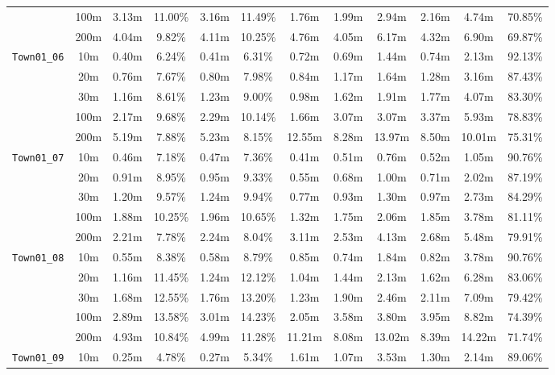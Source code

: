 \begin{table}
{\begin{tabular}{@{}cccccccccccc@{}}
      & 100m & 3.13m & 11.00\% & 3.16m & 11.49\% & 1.76m & 1.99m & 2.94m & 2.16m & 4.74m & 70.85\% \\
      & 200m & 4.04m & 9.82\% & 4.11m & 10.25\% & 4.76m & 4.05m & 6.17m & 4.32m & 6.90m & 69.87\% \\
      \midrule
      \multirow{5}{*}{\Verb|Town01_06|} & 10m & 0.40m & 6.24\% & 0.41m & 6.31\% & 0.72m & 0.69m & 1.44m & 0.74m & 2.13m & 92.13\% \\
      & 20m & 0.76m & 7.67\% & 0.80m & 7.98\% & 0.84m & 1.17m & 1.64m & 1.28m & 3.16m & 87.43\% \\
      & 30m & 1.16m & 8.61\% & 1.23m & 9.00\% & 0.98m & 1.62m & 1.91m & 1.77m & 4.07m & 83.30\% \\
      & 100m & 2.17m & 9.68\% & 2.29m & 10.14\% & 1.66m & 3.07m & 3.07m & 3.37m & 5.93m & 78.83\% \\
      & 200m & 5.19m & 7.88\% & 5.23m & 8.15\% & 12.55m & 8.28m & 13.97m & 8.50m & 10.01m & 75.31\% \\
      \midrule
      \multirow{5}{*}{\Verb|Town01_07|} & 10m & 0.46m & 7.18\% & 0.47m & 7.36\% & 0.41m & 0.51m & 0.76m & 0.52m & 1.05m & 90.76\% \\
      & 20m & 0.91m & 8.95\% & 0.95m & 9.33\% & 0.55m & 0.68m & 1.00m & 0.71m & 2.02m & 87.19\% \\
      & 30m & 1.20m & 9.57\% & 1.24m & 9.94\% & 0.77m & 0.93m & 1.30m & 0.97m & 2.73m & 84.29\% \\
      & 100m & 1.88m & 10.25\% & 1.96m & 10.65\% & 1.32m & 1.75m & 2.06m & 1.85m & 3.78m & 81.11\% \\
      & 200m & 2.21m & 7.78\% & 2.24m & 8.04\% & 3.11m & 2.53m & 4.13m & 2.68m & 5.48m & 79.91\% \\
      \midrule
      \multirow{5}{*}{\Verb|Town01_08|} & 10m & 0.55m & 8.38\% & 0.58m & 8.79\% & 0.85m & 0.74m & 1.84m & 0.82m & 3.78m & 90.76\% \\
      & 20m & 1.16m & 11.45\% & 1.24m & 12.12\% & 1.04m & 1.44m & 2.13m & 1.62m & 6.28m & 83.06\% \\
      & 30m & 1.68m & 12.55\% & 1.76m & 13.20\% & 1.23m & 1.90m & 2.46m & 2.11m & 7.09m & 79.42\% \\
      & 100m & 2.89m & 13.58\% & 3.01m & 14.23\% & 2.05m & 3.58m & 3.80m & 3.95m & 8.82m & 74.39\% \\
      & 200m & 4.93m & 10.84\% & 4.99m & 11.28\% & 11.21m & 8.08m & 13.02m & 8.39m & 14.22m & 71.74\% \\
      \midrule
      \multirow{5}{*}{\Verb|Town01_09|} & 10m & 0.25m & 4.78\% & 0.27m & 5.34\% & 1.61m & 1.07m & 3.53m & 1.30m & 2.14m & 89.06\% \\

\end{tabular}}
\end{table}

